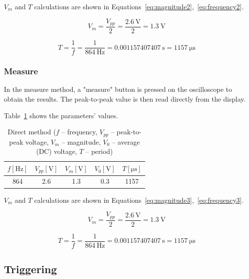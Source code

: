 $V_{m}$ and $T$ calculations are shown in Equations~\ref{eq:magnitude2},~\ref{eq:frequency2}.

\begin{equation}
	V_{m} = \frac{V_{pp}}{2} = \frac{\SI{2.6}{\volt}}{2} = \SI{1.3}{\volt}
	\label{eq:magnitude2}
\end{equation}

\begin{equation}
	T = \frac{1}{f} = \frac{1}{\SI{864}{\hertz}} = \SI{0.001157407407}{\second} = \SI{1157}{\micro\second}
	\label{eq:frequency2}
\end{equation}


\subsubsection*{Measure}

In the measure method, a "measure" button is pressed on the oscilloscope to obtain the results. The peak-to-peak value is then read directly from the display.

Table~\ref{tab:measure-method} shows the parameters' values.

\begin{table}[H]
	\centering
	\begin{tabular}{c|c|c|c|c}
		$f [\unit{\hertz}]$ & $V_{pp} [\unit{\volt}]$ & $V_{m} [\unit{\volt}]$ & $V_{0} [\unit{\volt}]$ & $T [\unit{\micro\second}]$\\
		\hline
		864 & 2.6 & 1.3 & 0.3 & 1157
	\end{tabular}
	\caption{Direct method ($f$ -- frequency, $V_{pp}$ -- peak-to-peak voltage, $V_{m}$ -- magnitude, $V_{0}$ -- average (DC) voltage, $T$ -- period)}
	\label{tab:measure-method}
\end{table}   

$V_{m}$ and $T$ calculations are shown in Equations~\ref{eq:magnitude3},~\ref{eq:frequency3}.

\begin{equation}
	V_{m} = \frac{V_{pp}}{2} = \frac{\SI{2.6}{\volt}}{2} = \SI{1.3}{\volt}
	\label{eq:magnitude3}
\end{equation}

\begin{equation}
	T = \frac{1}{f} = \frac{1}{\SI{864}{\hertz}} = \SI{0.001157407407}{\second} = \SI{1157}{\micro\second}
	\label{eq:frequency3}
\end{equation}

\subsection{Triggering}

